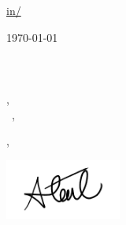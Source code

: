 \documentclass[12pt]{letter}
\begin{document}
\AddToShipoutPictureBG{%
\color{CambridgeBlue}
\AtPageUpperLeft{\rule[-1.3in]{\paperwidth}{1.3in}}
}

\begin{center}
{\fontsize{28}{0}\selectfont\scshape \myname}

\href{mailto:\myemail}{\faEnvelope\enspace \myemail}\hfill
\href{https://linkedin.com/in/\mylinkedin}{\faLinkedinIn\enspace in/\mylinkedin}\hfill
\href{tel:\myphone}{\faPhone\enspace \myphone}\hfill
\faMapMarker\enspace \mylocation
\end{center}

\vspace{0.2in}


\today\\

\vspace{-0.1in}\recipient\\
\company\\
\street\\
\city, \state\ \zip\\

\vspace{-0.1in}\greeting\ \recipient,\\

\vspace{-0.1in}\setlength\parindent{24pt}
\noindent

\vspace{0.1in}
\vfill

\begin{flushright}
\closer,

\vspace{-0.1in}\includegraphics[width=1.5in]{sig.png}\vspace{-0.1in}

\myname\\
\mytitle
\end{flushright}
\end{document}
